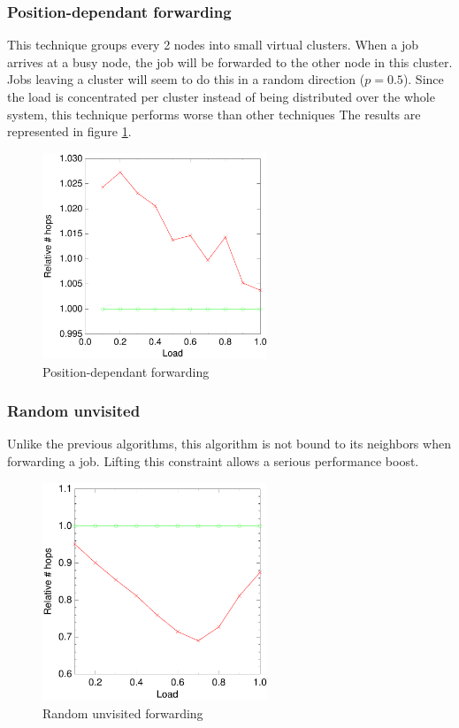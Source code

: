 \documentclass[10pt,a4paper]{article}
\begin{document}
\subsubsection*{Position-dependant forwarding}
This technique groups every 2 nodes into small virtual clusters. When a job arrives at a busy node, the job will be forwarded to the other node in this cluster. Jobs leaving a cluster will seem to do this in a random direction ($p=0.5$). Since the load is concentrated per cluster instead of being distributed over the whole system, this technique performs worse than other techniques The results are represented in figure \ref{figevenswitch}.

\begin{figure}[h!tb]
\centering
\includegraphics[width=0.6\textwidth]{data/evenswitchright.pdf}
\caption{Position-dependant forwarding}
\label{figevenswitch}
\end{figure}


\subsubsection*{Random unvisited}
Unlike the previous algorithms, this algorithm is not bound to its neighbors when forwarding a job. Lifting this constraint allows a serious performance boost.

\begin{figure}[h!tb]
\centering
\includegraphics[width=0.6\textwidth]{data/randunvisitedright.pdf}
\caption{Random unvisited forwarding}
\label{figrandunvisited}
\end{figure}
\end{document}

